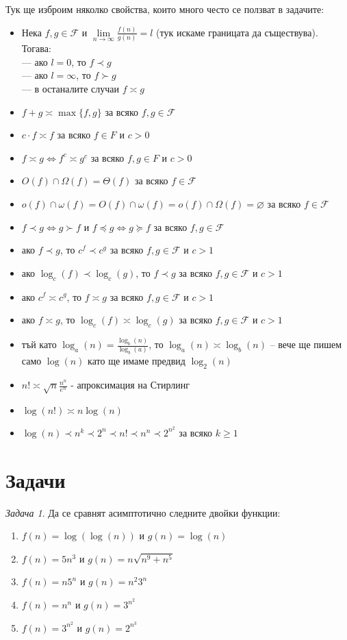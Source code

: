 \documentclass{article}
\newcommand{\F}{\mathcal{F}}
\theoremstyle{definition}
\theoremstyle{plain}
\theoremstyle{remark}
\newtheorem{problem}{Задача}
\theoremstyle{definition}
\begin{document}
Тук ще изброим няколко свойства, които много често се ползват в задачите:
\begin{itemize}
  \item Нека $f, g \in \F$ и $\lim\limits_{n \rightarrow \infty} \frac{f(n)}{g(n)} = l$ (тук искаме границата да съществува).
        Тогава: \\
        --- ако $l = 0$, то $f \prec g$ \\
        --- ако $l = \infty$, то $f \succ g$ \\
        --- в останалите случаи $f \asymp g$
  \item $f + g \asymp \max\{f, g\}$ за всяко $f, g \in \F$
  \item $c \cdot f \asymp f$ за всяко $f \in F$ и $c > 0$
  \item $f \asymp g \iff f^c \asymp g^c$ за всяко $f, g \in F$ и $c > 0$
  \item $O(f) \cap \Omega(f) = \Theta(f)$ за всяко $f \in \F$
  \item $o(f) \cap \omega(f) = O(f) \cap \omega(f) = o(f) \cap \Omega(f) = \varnothing$ за всяко $f \in \F$
  \item $f \prec g \iff g \succ f$ и $f \preceq g \iff g \succeq f$ за всяко $f, g \in \F$
  \item ако $f \prec g$, то $c^f \prec c^g$ за всяко $f, g \in \F$ и $c > 1$
  \item ако $\log_c(f) \prec \log_c(g)$, то $f \prec g$ за всяко $f, g \in \F$ и $c > 1$
  \item ако $c^f \asymp c^g$, то $f \asymp g$ за всяко $f, g \in \F$ и $c > 1$
  \item ако $f \asymp g$, то $\log_c(f) \asymp \log_c(g)$ за всяко $f, g \in \F$ и $c > 1$
  \item тъй като $\log_a(n) = \frac{\log_b(n)}{\log_b(a)}$, то $\log_a(n) \asymp \log_b(n)$ -- вече ще пишем само $\log(n)$ като ще имаме предвид $\log_2(n)$
  \item $n! \asymp \sqrt{n} \frac{n^n}{e^n}$ - апроксимация на Стирлинг
  \item $\log(n!) \asymp n \log(n)$
  \item $\log(n) \prec n^k \prec 2^n \prec n! \prec n^n \prec 2^{n^2}$ за всяко $k \geq 1$
\end{itemize}

\section*{Задачи}

\begin{problem}
Да се сравнят асимптотично следните двойки функции:
\begin{enumerate}
  \item $f(n) = \log(\log(n))$ и $g(n) = \log(n)$
  \item $f(n) = 5n^3$ и $g(n) = n \sqrt{n^9 + n^5}$
  \item $f(n) = n 5^n$ и $g(n) = n^ 2 3^n$
  \item $f(n) = n^n$ и $g(n) = 3^{n^2}$
  \item $f(n) = 3^{n^2}$ и $g(n) = 2^{n^3}$
\end{enumerate}
\end{problem}
\end{document}
